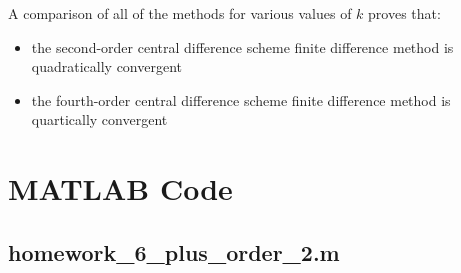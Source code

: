 \documentclass[10pt]{article}		%
\numberwithin{equation}{section}
\begin{document}
A comparison of all of the methods for various values of $k$ proves that:

\begin{itemize}
	\item the second-order central difference scheme finite difference method is quadratically convergent
	\item the fourth-order central difference scheme finite difference method is quartically convergent
\end{itemize}

\newpage

\appendix

\section{MATLAB Code}

\subsection{homework\_6\_plus\_order\_2.m}
\end{document}
